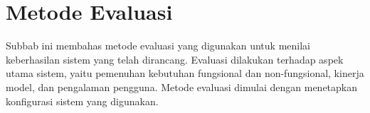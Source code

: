 \section{Metode Evaluasi}
\label{sec:metode-evaluasi} 
Subbab ini membahas metode evaluasi yang digunakan untuk menilai keberhasilan sistem yang telah dirancang. Evaluasi dilakukan terhadap aspek utama sistem, yaitu pemenuhan kebutuhan fungsional dan non-fungsional, kinerja model, dan pengalaman pengguna. Metode evaluasi dimulai dengan menetapkan konfigurasi sistem yang digunakan.


    




